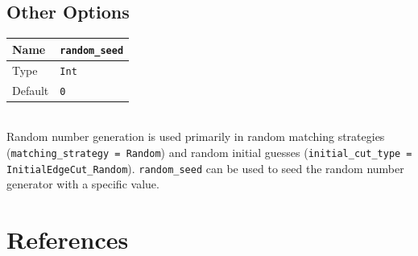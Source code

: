 \documentclass[letter]{article}
\begin{document}
\subsection{Other Options}

\begin{tabular}{|l|l|} \hline
Name & \texttt{random\_seed} \\ \hline
Type & \texttt{Int} \\ \hline
Default & \texttt{0} \\ \hline
\end{tabular}\\

Random number generation is used primarily in random matching strategies (\texttt{matching\_strategy = Random}) and random initial guesses (\texttt{initial\_cut\_type = InitialEdgeCut\_Random}). \texttt{random\_seed} can be used to seed the random number generator with a specific value.

\section{References}





\printindex
\end{document}
